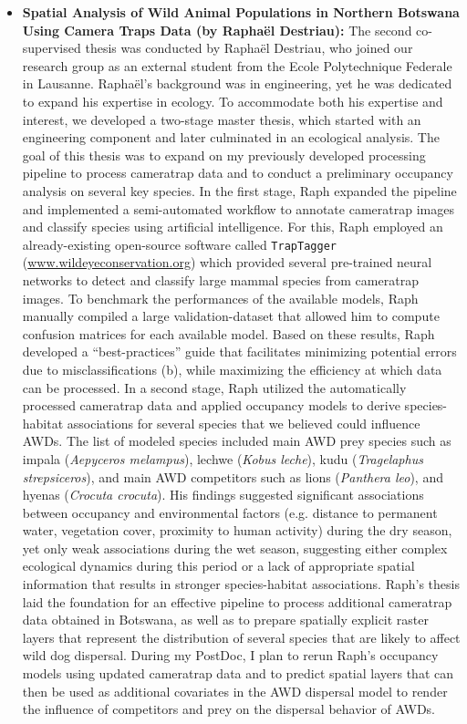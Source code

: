 \documentclass[../FinalThesis.tex]{subfiles}
\begin{document}
\begin{itemize}
  \item \textbf{Spatial Analysis of Wild Animal Populations in Northern Botswana
  Using Camera Traps Data (by Rapha{\"e}l Destriau):} The second co-supervised
  thesis was conducted by Rapha{\"e}l Destriau, who joined our research group as
  an external student from the Ecole Polytechnique Federale in Lausanne.
  Rapha{\"e}l's background was in engineering, yet he was dedicated to expand
  his expertise in ecology. To accommodate both his expertise and interest, we
  developed a two-stage master thesis, which started with an engineering
  component and later culminated in an ecological analysis. The goal of this
  thesis was to expand on my previously developed processing pipeline to process
  cameratrap data and to conduct a preliminary occupancy analysis on several key
  species. In the first stage, Raph expanded the pipeline and implemented a
  semi-automated workflow to annotate cameratrap images and classify species
  using artificial intelligence. For this, Raph employed an already-existing
  open-source software called \texttt{TrapTagger}
  (\url{www.wildeyeconservation.org}) which provided several pre-trained neural
  networks to detect and classify large mammal species from cameratrap images.
  To benchmark the performances of the available models, Raph manually compiled
  a large validation-dataset that allowed him to compute confusion matrices for
  each available model. Based on these results, Raph developed a
  ``best-practices'' guide that facilitates minimizing potential errors due to
  misclassifications (b), while maximizing the efficiency at
  which data can be processed. In a second stage, Raph utilized the
  automatically processed cameratrap data and applied occupancy models to derive
  species-habitat associations for several species that we believed could
  influence AWDs. The list of modeled species included main AWD prey species
  such as impala (\textit{Aepyceros melampus}), lechwe (\textit{Kobus leche}),
  kudu (\textit{Tragelaphus strepsiceros}), and main AWD competitors such as
  lions (\textit{Panthera leo}), and hyenas (\textit{Crocuta crocuta}). His
  findings suggested significant associations between occupancy and
  environmental factors (e.g. distance to permanent water, vegetation cover,
  proximity to human activity) during the dry season, yet only weak associations
  during the wet season, suggesting either complex ecological dynamics during
  this period or a lack of appropriate spatial information that results in
  stronger species-habitat associations. Raph's thesis laid the foundation for
  an effective pipeline to process additional cameratrap data obtained in
  Botswana, as well as to prepare spatially explicit raster layers that
  represent the distribution of several species that are likely to affect wild
  dog dispersal. During my PostDoc, I plan to rerun Raph's occupancy models
  using updated cameratrap data and to predict spatial layers that can then be
  used as additional covariates in the AWD dispersal model to render the
  influence of competitors and prey on the dispersal behavior of AWDs.

\end{itemize}
\end{document}
